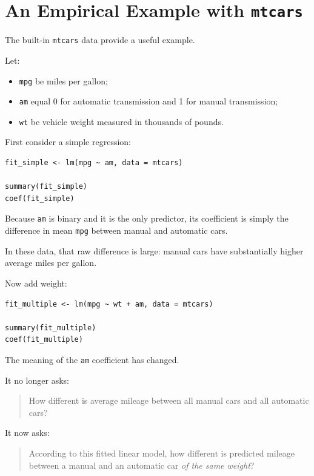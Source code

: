 \documentclass[11pt]{report}
\begin{document}
\section{An Empirical Example with \texttt{mtcars}}

The built-in \texttt{mtcars} data provide a useful example.

Let:

\begin{itemize}
    \item \texttt{mpg} be miles per gallon;
    \item \texttt{am} equal 0 for automatic transmission and 1 for manual transmission;
    \item \texttt{wt} be vehicle weight measured in thousands of pounds.
\end{itemize}

First consider a simple regression:

\begin{lstlisting}
fit_simple <- lm(mpg ~ am, data = mtcars)

summary(fit_simple)
coef(fit_simple)
\end{lstlisting}

Because \texttt{am} is binary and it is the only predictor, its coefficient is simply the difference in mean \texttt{mpg} between manual and automatic cars.

In these data, that raw difference is large: manual cars have substantially higher average miles per gallon.

Now add weight:

\begin{lstlisting}
fit_multiple <- lm(mpg ~ wt + am, data = mtcars)

summary(fit_multiple)
coef(fit_multiple)
\end{lstlisting}

The meaning of the \texttt{am} coefficient has changed.

It no longer asks:

\begin{quote}
How different is average mileage between all manual cars and all automatic cars?
\end{quote}

It now asks:

\begin{quote}
According to this fitted linear model, how different is predicted mileage between a manual and an automatic car \emph{of the same weight}?
\end{quote}
\end{document}
